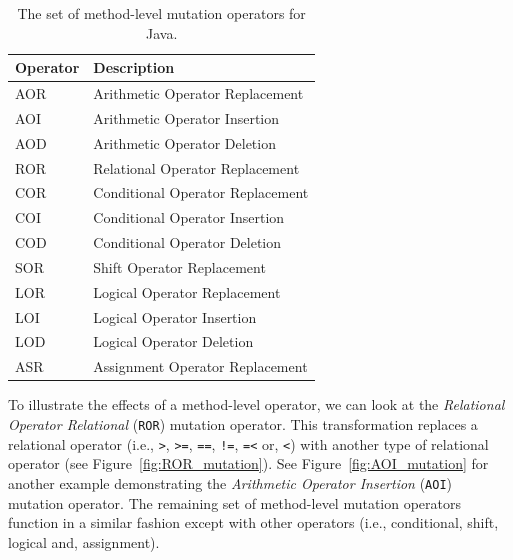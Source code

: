 \begin{table}[h]
  \centering
  \begin{tabular}{|l|l|}
    \hline
    \rowcolor[RGB]{169,196,223}
    \textbf{Operator} & \textbf{Description} \\
    \hline AOR & Arithmetic Operator Replacement \\
    \hline AOI & Arithmetic Operator Insertion \\
    \hline AOD & Arithmetic Operator Deletion \\
    \hline ROR & Relational Operator Replacement \\
    \hline COR & Conditional Operator Replacement \\
    \hline COI & Conditional Operator Insertion \\
    \hline COD & Conditional Operator Deletion \\
    \hline SOR & Shift Operator Replacement \\
    \hline LOR & Logical Operator Replacement \\
    \hline LOI & Logical Operator Insertion \\
    \hline LOD & Logical Operator Deletion \\
    \hline ASR & Assignment Operator Replacement \\
    \hline
  \end{tabular}
  \caption{The set of method-level mutation operators for Java.}
  \label{tab:method_operators}
\end{table}

To illustrate the effects of a method-level operator, we can look at the \emph{Relational Operator Relational} (\texttt{ROR}) mutation operator. This transformation replaces a relational operator (i.e., \texttt{>}, \texttt{>=}, \texttt{==}, \texttt{!=}, \texttt{=<} or, \texttt{<}) with another type of relational operator (see Figure~\ref{fig:ROR_mutation}). See Figure~\ref{fig:AOI_mutation} for another example demonstrating the \emph{Arithmetic Operator Insertion} (\texttt{AOI}) mutation operator. The remaining set of method-level mutation operators function in a similar fashion except with other operators (i.e., conditional, shift, logical and, assignment).

